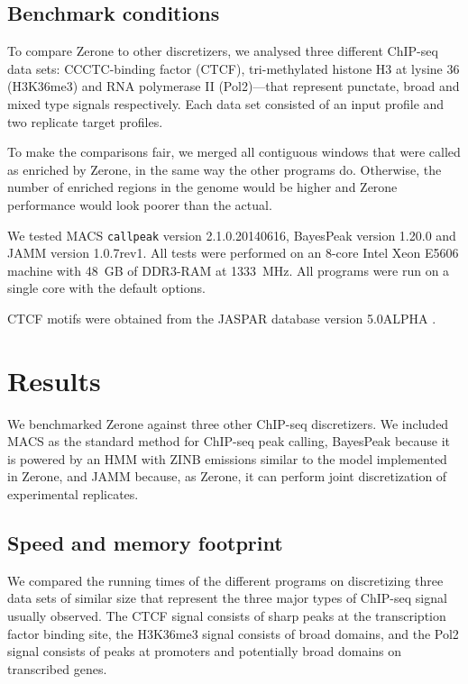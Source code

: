\documentclass{bioinfo}
\begin{document}
\begin{methods}
\subsection{Benchmark conditions}
To compare Zerone to other discretizers, we analysed three different
ChIP-seq data sets: CCCTC-binding factor (CTCF), tri-methylated histone H3 at
lysine 36 (H3K36me3) and RNA polymerase II (Pol2)---that represent punctate,
broad and mixed type signals respectively. Each data set consisted of an input
profile and two replicate target profiles.

To make the comparisons fair, we merged all contiguous windows that were called
as enriched by Zerone, in the same way the other programs do. Otherwise, the
number of enriched regions in the genome would be higher and Zerone performance
would look poorer than the actual.

We tested MACS \texttt{callpeak} version 2.1.0.20140616, BayesPeak
version 1.20.0 and JAMM version 1.0.7rev1. All tests were performed on
an 8-core Intel Xeon E5606 machine with 48~GB of DDR3-RAM at 1333~MHz.
All programs were run on a single core with the default options.

CTCF motifs were obtained from the JASPAR database version
5.0{\textunderscore}ALPHA \citep{pmid24194598}.

\end{methods}

\section{Results}
\label{sec:results}
We benchmarked Zerone against three other ChIP-seq discretizers.
We included MACS as the standard method for ChIP-seq peak calling,
BayesPeak because it is powered by an HMM with ZINB emissions
similar to the model implemented in Zerone, and JAMM because, as
Zerone, it can perform joint discretization of experimental replicates.

\subsection{Speed and memory footprint}

We compared the running times of the different programs on discretizing
three data sets of similar size that represent the three major types of
ChIP-seq signal usually observed. The CTCF signal consists of sharp
peaks at the transcription factor binding site, the H3K36me3 signal
consists of broad domains, and the Pol2 signal consists of  peaks
at promoters and potentially broad domains on transcribed genes.
\end{document}
